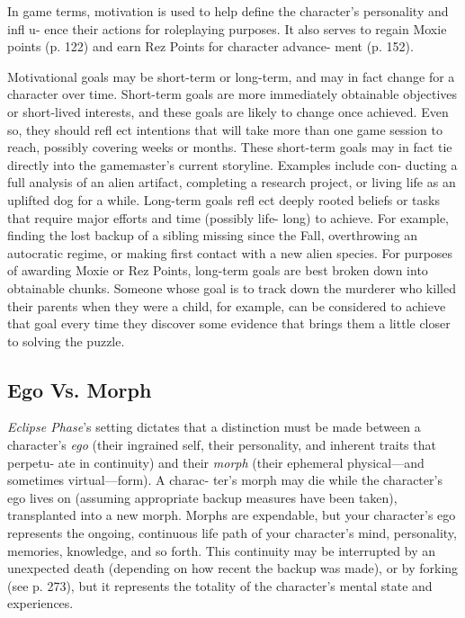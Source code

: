 In game terms, motivation is used to help 
define the character's personality and infl u-
ence their actions for roleplaying purposes. 
It also serves to regain Moxie points (p. 122) 
and earn Rez Points for character advance-
ment (p. 152).

Motivational goals may be short-term or long-term, 
and may in fact change for a character over time. 
Short-term goals are more immediately obtainable 
objectives or short-lived interests, and these goals are 
likely to change once achieved. Even so, they should 
refl ect intentions that will take more than one game 
session to reach, possibly covering weeks or months. 
These short-term goals may in fact tie directly into the 
gamemaster's current storyline. Examples include con-
ducting a full analysis of an alien artifact, completing 
a research project, or living life as an uplifted dog for a 
while. Long-term goals refl ect deeply rooted beliefs or 
tasks that require major efforts and time (possibly life-
long) to achieve. For example, finding the lost backup 
of a sibling missing since the Fall, overthrowing an 
autocratic regime, or making first contact with a new 
alien species. For purposes of awarding Moxie or Rez 
Points, long-term goals are best broken down into 
obtainable chunks. Someone whose goal is to track 
down the murderer who killed their parents when they 
were a child, for example, can be considered to achieve 
that goal every time they discover some evidence that 
brings them a little closer to solving the puzzle.

\subsection{Ego Vs. Morph}

\textit{Eclipse Phase}'s setting dictates that a distinction must 
be made between a character's \textit{ego} (their ingrained 
self, their personality, and inherent traits that perpetu-
ate in continuity) and their \textit{morph} (their ephemeral 
physical—and sometimes virtual—form). A charac-
ter's morph may die while the character's ego lives on 
(assuming appropriate backup measures have been 
taken), transplanted into a new morph. Morphs are 
expendable, but your character's ego represents the 
ongoing, continuous life path of your character's mind, 
personality, memories, knowledge, and so forth. This 
continuity may be interrupted by an unexpected death 
(depending on how recent the backup was made), or 
by forking (see p. 273), but it represents the totality of 
the character's mental state and experiences.

